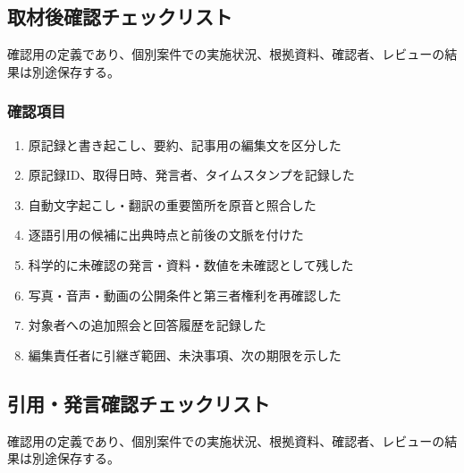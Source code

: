 \documentclass[a4paper,11pt]{article}
\begin{document}
\subsection{取材後確認チェックリスト}
\par 確認用の定義であり、個別案件での実施状況、根拠資料、確認者、レビューの結果は別途保存する。\par\medskip
\subsubsection*{確認項目}
\begin{enumerate}[leftmargin=2em,itemsep=0.3em]
\item 原記録と書き起こし、要約、記事用の編集文を区分した\par
\item 原記録ID、取得日時、発言者、タイムスタンプを記録した\par
\item 自動文字起こし・翻訳の重要箇所を原音と照合した\par
\item 逐語引用の候補に出典時点と前後の文脈を付けた\par
\item 科学的に未確認の発言・資料・数値を未確認として残した\par
\item 写真・音声・動画の公開条件と第三者権利を再確認した\par
\item 対象者への追加照会と回答履歴を記録した\par
\item 編集責任者に引継ぎ範囲、未決事項、次の期限を示した\par
\end{enumerate}
\subsection{引用・発言確認チェックリスト}
\par 確認用の定義であり、個別案件での実施状況、根拠資料、確認者、レビューの結果は別途保存する。\par\medskip
\end{document}
